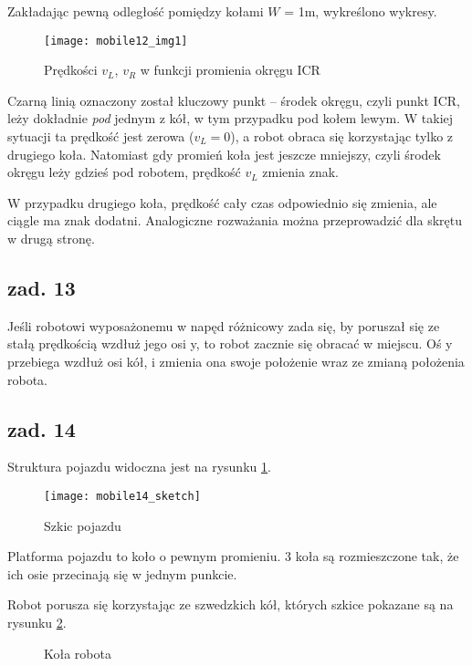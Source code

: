 \documentclass[11pt, a4paper]{article}
\begin{document}
Zakładając pewną odległość pomiędzy kołami $W$ = 1m, wykreślono wykresy.
\begin{figure}[htbp!]
	\centering
	\texttt{[image: mobile12\_img1]}
	\caption{Prędkości $v_L$, $v_R$ w funkcji promienia okręgu ICR}
\end{figure}

Czarną linią oznaczony został kluczowy punkt -- środek okręgu, czyli punkt ICR, leży dokładnie \emph{pod} jednym z kół, w tym przypadku pod kołem lewym. W takiej sytuacji ta prędkość jest zerowa ($v_L = 0$), a robot obraca się korzystając tylko z drugiego koła. Natomiast gdy promień koła jest jeszcze mniejszy, czyli środek okręgu leży gdzieś pod robotem, prędkość $v_L$ zmienia znak.

W przypadku drugiego koła, prędkość cały czas odpowiednio się zmienia, ale ciągle ma znak dodatni. Analogiczne rozważania można przeprowadzić dla skrętu w drugą stronę.

\subsection*{zad. 13}

Jeśli robotowi wyposażonemu w napęd różnicowy zada się, by poruszał się ze stałą prędkością wzdłuż jego osi y, to robot zacznie się obracać w miejscu. Oś y przebiega wzdłuż osi kół, i zmienia ona swoje położenie wraz ze zmianą położenia robota.

\subsection*{zad. 14}

Struktura pojazdu widoczna jest na rysunku \ref{fig:mobile14pojazd}.
\begin{figure}[hbt!]
	\centering
	\texttt{[image: mobile14\_sketch]}
	\caption{Szkic pojazdu \label{fig:mobile14pojazd}}
\end{figure}

Platforma pojazdu to koło o pewnym promieniu. 3 koła są rozmieszczone tak, że ich osie przecinają się w jednym punkcie.

Robot porusza się korzystając ze szwedzkich kół, których szkice pokazane są na rysunku \ref{fig:mobile14kola}.
\begin{figure}[htb!]
	\centering

	
	\caption{Koła robota \label{fig:mobile14kola}}
\end{figure}
\end{document}
